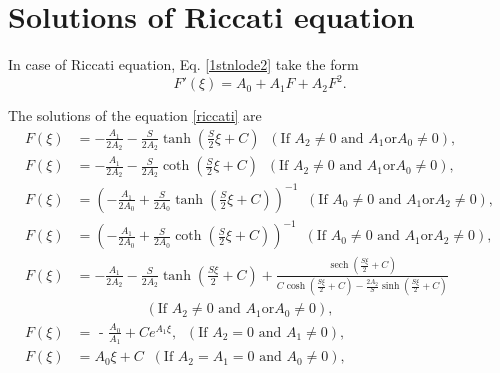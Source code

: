 \documentclass[prd,aps,floats,showkeys,nofootinbib,notitlepage]{revtex4-2}
\begin{document}
	
	\appendix
	
	\renewcommand{\theequation}{A-\arabic{equation}}
	\section{Solutions of Riccati equation}\label{sec:appenA}
	
	In case of Riccati equation, Eq. \eqref{1stnlode2} take the form
	\begin{equation}\label{riccati}
		F'\left( \xi  \right) = {A_0} + {A_1}F + {A_2}{F^2}.
	\end{equation} 
	
	The solutions of the equation \eqref{riccati} are \cite{yang}
	\begin{subequations}\label{riccati_solu}
		\begin{align}
			\label{riccati_solu1}F\left( \xi  \right) &= - \frac{{{A_1}}}{{2{A_2}}} - \frac{S}{{2{A_2}}}\tanh \left( {\frac{S}{2}\xi  + C} \right) \;\;(\text{If } A_2 \neq 0 \text{ and } A_1 \text{or} A_0 \neq 0),\\
			F\left( \xi  \right) &= - \frac{{{A_1}}}{{2{A_2}}} - \frac{S}{{2{A_2}}}\coth \left( {\frac{S}{2}\xi  + C} \right) \;\;(\text{If } A_2 \neq 0 \text{ and } A_1 \text{or} A_0 \neq 0),\\
			F\left( \xi  \right) &= {\left( { - \frac{{{A_1}}}{{2{A_0}}} + \frac{S}{{2{A_0}}}\tanh \left( {\frac{S}{2}\xi  + C} \right)} \right)^{ - 1}} \;\;(\text{If }A_0 \neq 0 \text{ and } A_1 \text{or} A_2 \neq 0),\\
			F\left( \xi  \right) &= {\left( { - \frac{{{A_1}}}{{2{A_0}}} + \frac{S}{{2{A_0}}}\coth \left( {\frac{S}{2}\xi  + C} \right)} \right)^{ - 1}} \;\;(\text{If }A_0 \neq 0 \text{ and } A_1 \text{or} A_2 \neq 0),\\
			\label{riccati_solu2e}F\left( \xi  \right) &=  - \frac{{{A_1}}}{{2{A_2}}} - \frac{S }{{2{A_2}}}\tanh \left( {\frac{{S \xi }}{2}+C} \right) + \frac{{\operatorname{sech} \left( {\frac{{S \xi }}{2}+C} \right)}}{{{C}\cosh \left( {\frac{{S \xi }}{2}+C} \right) - \frac{{2{A_2}}}{S }\sinh \left( {\frac{{S \xi }}{2}+C} \right)}}\\
			& \,\,\,\,\,\,\,\,\,\,\,\,\,\,\,\,\,\,\,\,\,\,\,\,\,\,\,\,\,\,(\text{If } A_2 \neq 0 \text{ and } A_1 \text{or} A_0 \neq 0),\nonumber\\
			\label{riccati_soluA2f}F\left( \xi  \right) &= {\text{ - }}\frac{{{A_0}}}{{{A_1}}} + C{e^{ {{A_1}\xi }}},\;\; (\text{If } A_2=0 \text{ and } A_1\neq 0),\\
			F\left( \xi  \right) &= A_0\xi +C\;\;(\text{If }  A_2=A_1=0 \text{ and } A_0\neq 0 ),	
		\end{align}
	\end{subequations}
	
\end{document}
